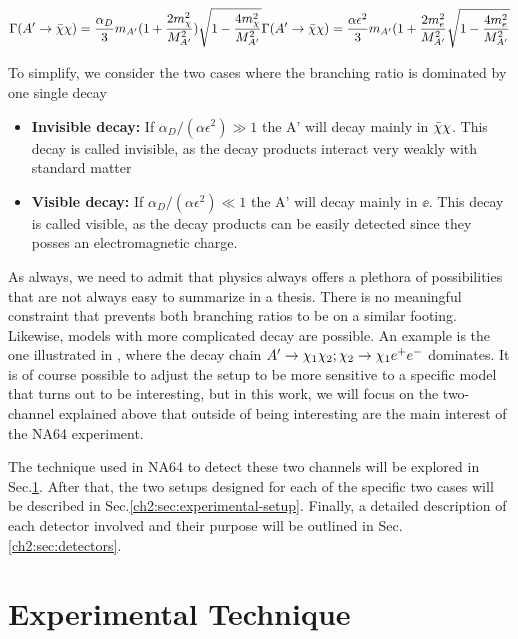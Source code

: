 \begin{equation}
\label{ch1:eq:dm-bratio}
\Gamma(A'\rightarrow\bar{\chi} \chi) = \frac{\alpha_D}{3}m_{A'}(1 + \frac{2m^2_{\chi}}{M^2_{A'}})\sqrt{1 - \frac{4m^2_{\chi}}{M^2_{A'}}} 
\Gamma(A'\rightarrow\bar{\chi} \chi) = \frac{\alpha \epsilon^2}{3}m_{A'}(1 + \frac{2m^2_{e}}{M^2_{A'}}\sqrt{1 - \frac{4m^2_{e}}{M^2_{A'}}} 
\end{equation}

To simplify, we consider the two cases where the branching ratio is dominated by one single decay

\begin{itemize}
\item \textbf{Invisible decay:} If $\alpha_D / (\alpha \epsilon^2) \gg 1$ the A' will decay mainly in $\bar{\chi} \chi$. This decay is called invisible, as the decay products interact very weakly with standard matter
\item \textbf{Visible decay:} If $\alpha_D / (\alpha \epsilon^2) \ll 1$ the A' will decay mainly in $\ee$. This decay is called visible, as the decay products can be easily detected since they posses an electromagnetic charge. 
\end{itemize}

As always, we need to admit that physics always offers a plethora of possibilities that are not always easy to summarize in a thesis. There is no meaningful constraint that prevents both branching ratios to be on a similar footing. Likewise, models with more complicated decay are possible. An example is the one illustrated in \cite{Mohlabeng_2019}, where the decay chain $A' \to \chi_1 \chi_2; \chi_2 \to \chi_1 e^+e^-$ dominates. It is of course possible to adjust the setup to be more sensitive to a specific model that turns out to be interesting, but in this work, we will focus on the two-channel explained above that outside of being interesting are the main interest of the NA64 experiment.

The technique used in NA64 to detect these two channels will be explored in Sec.\ref{ch2:sec:experimental-technique}. After that, the two setups designed for each of the specific two cases will be described in Sec.\ref{ch2:sec:experimental-setup}. Finally, a detailed description of each detector involved and their purpose will be outlined in Sec.\ref{ch2:sec:detectors}.


\section{Experimental Technique}
\label{ch2:sec:experimental-technique}


